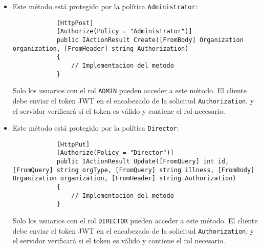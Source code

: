 \begin{itemize}
\begin{itemize}
\begin{lstlisting}
        \end{lstlisting}
        \item Este método está protegido por la política \texttt{Administrator}:
        \begin{lstlisting}
            [HttpPost]
            [Authorize(Policy = "Administrator")]
            public IActionResult Create([FromBody] Organization organization, [FromHeader] string Authorization)
            {
                // Implementacion del metodo
            }

        \end{lstlisting}
        Solo los usuarios con el rol \texttt{ADMIN} pueden acceder a este método. El
        cliente debe enviar el token JWT en el encabezado de la solicitud
        \texttt{Authorization}, y el servidor verificará si el token es válido y
        contiene el rol necesario.
        \item Este método está protegido por la política \texttt{Director}:
        \begin{lstlisting}
            [HttpPut]
            [Authorize(Policy = "Director")]
            public IActionResult Update([FromQuery] int id, [FromQuery] string orgType, [FromQuery] string illness, [FromBody] Organization organization, [FromHeader] string Authorization)
            {
                // Implementacion del metodo
            }
        \end{lstlisting}
        Solo los usuarios con el rol \texttt{DIRECTOR} pueden acceder a este método. El
        cliente debe enviar el token JWT en el encabezado de la solicitud
        \texttt{Authorization}, y el servidor verificará si el token es válido y
        contiene el rol necesario.    
    \end{itemize}
    
\end{itemize}

